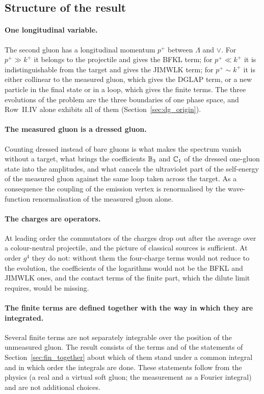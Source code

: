 \subsection{Structure of the result}\label{sec:disc_lessons}

\paragraph{One longitudinal variable.} The second gluon has a longitudinal momentum $p^+$ between $\Lambda$ and $\vee$. For $p^+\gg k^+$ it belongs to the projectile and gives the BFKL term; for $p^+\ll k^+$ it is indistinguishable from the target and gives the JIMWLK term; for $p^+\sim k^+$ it is either collinear to the measured gluon, which gives the DGLAP term, or a new particle in the final state or in a loop, which gives the finite terms. The three evolutions of the problem are the three boundaries of one phase space, and Row~II.IV alone exhibits all of them (Section~\ref{sec:dg_origin}).

\paragraph{The measured gluon is a dressed gluon.} Counting dressed instead of bare gluons is what makes the spectrum vanish without a target, what brings the coefficients $\mathbb{B}_3$ and $\mathbb{C}_1$ of the dressed one-gluon state into the amplitudes, and what cancels the ultraviolet part of the self-energy of the measured gluon against the same loop taken across the target. As a consequence the coupling of the emission vertex is renormalised by the wave-function renormalisation of the measured gluon alone.

\paragraph{The charges are operators.} At leading order the commutators of the charges drop out after the average over a colour-neutral projectile, and the picture of classical sources is sufficient. At order $g^4$ they do not: without them the four-charge terms would not reduce to the evolution, the coefficients of the logarithms would not be the BFKL and JIMWLK ones, and the contact terms of the finite part, which the dilute limit requires, would be missing.

\paragraph{The finite terms are defined together with the way in which they are integrated.} Several finite terms are not separately integrable over the position of the unmeasured gluon. The result consists of the terms and of the statements of Section~\ref{sec:fin_together} about which of them stand under a common integral and in which order the integrals are done. These statements follow from the physics (a real and a virtual soft gluon; the measurement as a Fourier integral) and are not additional choices.

